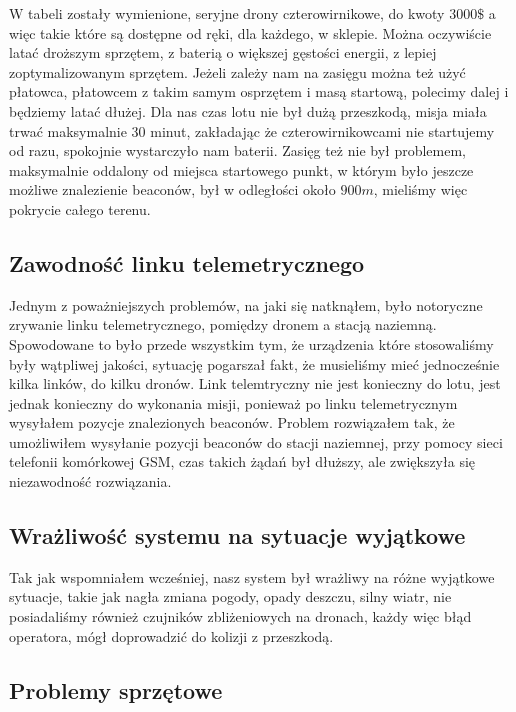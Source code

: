 W tabeli zostały wymienione, seryjne drony czterowirnikowe, do kwoty $3000\$$ a więc takie które są dostępne od ręki, dla każdego, w sklepie. Można oczywiście latać droższym sprzętem, z baterią o większej gęstości energii, z lepiej zoptymalizowanym sprzętem. Jeżeli zależy nam na zasięgu można też użyć płatowca, płatowcem z takim samym osprzętem i masą startową, polecimy dalej i będziemy latać dłużej. Dla nas czas lotu nie był dużą przeszkodą, misja miała trwać maksymalnie 30 minut, zakładając że czterowirnikowcami nie startujemy od razu, spokojnie wystarczyło nam baterii. Zasięg też nie był problemem, maksymalnie oddalony od miejsca startowego punkt, w którym było jeszcze możliwe znalezienie beaconów, był w odległości około $900 m$, mieliśmy więc pokrycie całego terenu.

\subsection{Zawodność linku telemetrycznego}

Jednym z poważniejszych problemów, na jaki się natknąłem, było notoryczne zrywanie linku telemetrycznego, pomiędzy dronem a stacją naziemną. Spowodowane to było przede wszystkim tym, że urządzenia które stosowaliśmy były wątpliwej jakości, sytuację pogarszał fakt, że musieliśmy mieć jednocześnie kilka linków, do kilku dronów. Link telemtryczny nie jest konieczny do lotu, jest jednak konieczny do wykonania misji, ponieważ po linku telemetrycznym wysyłałem pozycje znalezionych beaconów. Problem rozwiązałem tak, że umożliwiłem wysyłanie pozycji beaconów do stacji naziemnej, przy pomocy sieci telefonii komórkowej GSM, czas takich żądań był dłuższy, ale zwiększyła się niezawodność rozwiązania.

\subsection{Wrażliwość systemu na sytuacje wyjątkowe}

Tak jak wspomniałem wcześniej, nasz system był wrażliwy na różne wyjątkowe sytuacje, takie jak nagła zmiana pogody, opady deszczu, silny wiatr, nie posiadaliśmy również czujników zbliżeniowych na dronach, każdy więc błąd operatora, mógł doprowadzić do kolizji z przeszkodą.

\subsection{Problemy sprzętowe}

